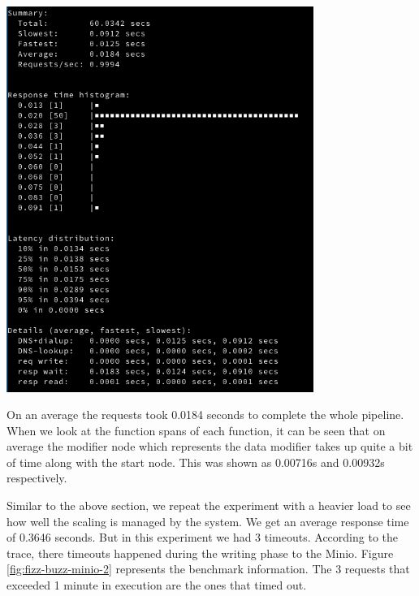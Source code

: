 \documentclass[12pt,titlepage]{article}
\begin{document}
\begin{center}
   \begin{minipage}{\linewidth}
     \centering
     \includegraphics[width=100mm]{./thesis_images/fizz-buzz-minio-1.png}
     \label{fig:fizz-buzz-minio}
   \end{minipage}
\end{center}

On an average the requests took 0.0184 seconds to complete the whole pipeline.
When we look at the function spans of each function, it can be seen that on
average the modifier node which represents the data modifier takes up quite a
bit of time along with the start node. This was shown as 0.00716s and 0.00932s respectively.

Similar to the above section, we repeat the experiment with a heavier load to
see how well the scaling is managed by the system. We get an average response
time of 0.3646 seconds. But in this experiment we had 3 timeouts. According to
the trace, there timeouts happened during the writing phase to the Minio. Figure
\ref{fig:fizz-buzz-minio-2} represents the benchmark information. The 3 requests
that exceeded 1 minute in execution are the ones that timed out.
\end{document}
